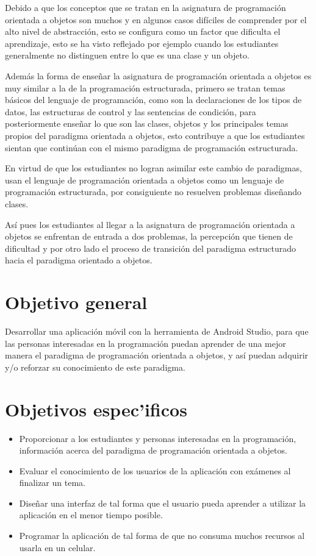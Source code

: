 Debido a que los conceptos que se tratan en la asignatura de programación orientada a objetos son muchos y en algunos casos difíciles de comprender por el alto nivel de abstracción, esto se configura como un factor que dificulta el aprendizaje, esto se ha visto reflejado por ejemplo cuando los estudiantes generalmente no distinguen entre lo que es una clase y un objeto.

Además la forma de enseñar la asignatura de programación orientada a objetos es muy similar a la de la programación estructurada, primero se tratan temas básicos del lenguaje de programación, como son la declaraciones de los tipos de datos, las estructuras de control y las sentencias de condición, para posteriormente enseñar lo que son las clases, objetos y los principales temas propios del paradigma orientada a objetos, esto contribuye a que los estudiantes sientan que continúan con el mismo paradigma de programación estructurada.

En virtud de que los estudiantes no logran asimilar este cambio de paradigmas, usan el lenguaje de programación orientada a objetos como un lenguaje de programación estructurada, por consiguiente no resuelven problemas diseñando clases.

Así pues los estudiantes al llegar a la asignatura de programación orientada a objetos se enfrentan de entrada a dos problemas, la percepción que tienen de dificultad y por otro lado el proceso de transición del paradigma estructurado hacia el paradigma orientado a objetos.

\section{Objetivo general}
Desarrollar una aplicación móvil con la herramienta de Android Studio, para que las personas interesadas en la programación puedan aprender de una mejor manera el paradigma de programación orientada a objetos, y así puedan adquirir y/o reforzar su conocimiento de este paradigma. 

\section{Objetivos espec'ificos} 
\begin{itemize}
\item Proporcionar a los estudiantes y personas interesadas en la programación, información acerca del paradigma de programación orientada a objetos.
\item Evaluar el conocimiento de los usuarios de la aplicación con exámenes al finalizar un tema.
\item Diseñar una interfaz de tal forma que el usuario pueda aprender a utilizar la aplicación en el menor tiempo posible.
\item Programar la aplicación de tal forma de que no consuma muchos recursos al usarla en un celular.
\end{itemize}
